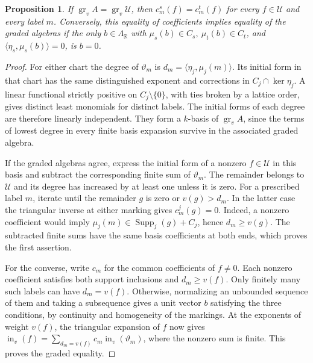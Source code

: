 \documentclass[11pt,reqno]{amsart}
\numberwithin{equation}{section}
\newtheorem{proposition}[theorem]{Proposition}
\theoremstyle{definition}
\theoremstyle{remark}
\DeclareMathOperator{\Supp}{Supp}
\begin{document}
\begin{proposition}\label{prop:facet-graded-transport}
If \(\operatorname{gr}_v A=\operatorname{gr}_v\mathcal U\), then
\(c_m^s(f)=c_m^t(f)\) for every \(f\in\mathcal U\) and every label
\(m\). Conversely, this equality of coefficients implies equality
of the graded algebras if the only \(b\in\Lambda_{\mathbb R}\) with
$\mu_s(b)\in C_s,\ \mu_t(b)\in C_t$, and $\langle\eta_s,\mu_s(b)\rangle=0$, is $b=0$.
\end{proposition}
\begin{proof}
For either chart the degree of \(\vartheta_m\) is
\(d_m=\langle\eta_j,\mu_j(m)\rangle\). Its initial form in that
chart has the same distinguished exponent and corrections in
\(C_j\cap\ker\eta_j\). A linear functional strictly positive on
\(C_j\setminus\{0\}\), with ties broken by a lattice order, gives
distinct least monomials for distinct labels. The initial forms of
each degree are therefore linearly independent. They form a
\(k\)-basis of \(\operatorname{gr}_v A\), since the terms of lowest
degree in every finite basis expansion survive in the associated
graded algebra.

If the graded algebras agree, express the initial form of a nonzero
\(f\in\mathcal U\) in this basis and subtract the corresponding
finite sum of \(\vartheta_m\). The remainder belongs to \(\mathcal U\)
and its degree has increased by at least one unless it is zero. For
a prescribed label \(m\), iterate until the remainder \(g\) is zero
or \(v(g)>d_m\). In the latter case the triangular inverse at
either marking gives \(c_m^j(g)=0\). Indeed, a nonzero coefficient
would imply \(\mu_j(m)\in\Supp_j(g)+C_j\), hence
\(d_m\ge v(g)\). The subtracted finite sums have the same basis
coefficients at both ends, which proves the first assertion.

For the converse, write \(c_m\) for the common coefficients of
\(f\ne0\). Each nonzero coefficient satisfies both support
inclusions and \(d_m\ge v(f)\). Only finitely many such labels can
have \(d_m=v(f)\). Otherwise, normalizing an unbounded sequence
of them and taking a subsequence gives a unit vector \(b\)
satisfying the three conditions, by continuity and homogeneity of
the markings. At the exponents of weight \(v(f)\), the triangular
expansion of \(f\) now gives
\(\operatorname{in}_v(f)=\sum_{d_m=v(f)}c_m
\operatorname{in}_v(\vartheta_m)\), where the nonzero sum is finite.
This proves the graded equality.
\end{proof}
\end{document}
